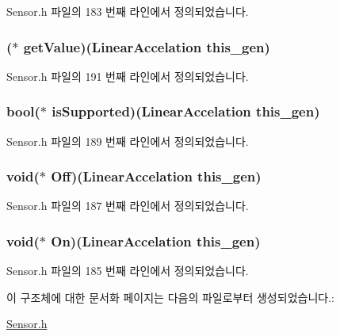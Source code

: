 Sensor.\-h 파일의 183 번째 라인에서 정의되었습니다.

\hypertarget{struct___linear_accelation_aaf02870c60aa510568b3376a4cd4d965}{
\subsubsection[{get\-Value}]{($\ast$  get\-Value)({\bf Linear\-Accelation} this\-\_\-gen)}}\label{struct___linear_accelation_aaf02870c60aa510568b3376a4cd4d965}


Sensor.\-h 파일의 191 번째 라인에서 정의되었습니다.

\hypertarget{struct___linear_accelation_afc42a6003589d08871b06adfc3f2ee9c}{
\subsubsection[{is\-Supported}]{\setlength{\rightskip}{0pt plus 5cm}bool($\ast$  is\-Supported)({\bf Linear\-Accelation} this\-\_\-gen)}}\label{struct___linear_accelation_afc42a6003589d08871b06adfc3f2ee9c}


Sensor.\-h 파일의 189 번째 라인에서 정의되었습니다.

\hypertarget{struct___linear_accelation_a5ecc7fba6af596a66129373e0157f9a2}{
\subsubsection[{Off}]{\setlength{\rightskip}{0pt plus 5cm}void($\ast$  Off)({\bf Linear\-Accelation} this\-\_\-gen)}}\label{struct___linear_accelation_a5ecc7fba6af596a66129373e0157f9a2}


Sensor.\-h 파일의 187 번째 라인에서 정의되었습니다.

\hypertarget{struct___linear_accelation_a94a5c6752cd1bf18e8d4f1aff25c88e8}{
\subsubsection[{On}]{\setlength{\rightskip}{0pt plus 5cm}void($\ast$  On)({\bf Linear\-Accelation} this\-\_\-gen)}}\label{struct___linear_accelation_a94a5c6752cd1bf18e8d4f1aff25c88e8}


Sensor.\-h 파일의 185 번째 라인에서 정의되었습니다.



이 구조체에 대한 문서화 페이지는 다음의 파일로부터 생성되었습니다.\-:\begin{DoxyCompactItemize}
\item 
\hyperlink{_sensor_8h}{Sensor.\-h}\end{DoxyCompactItemize}

